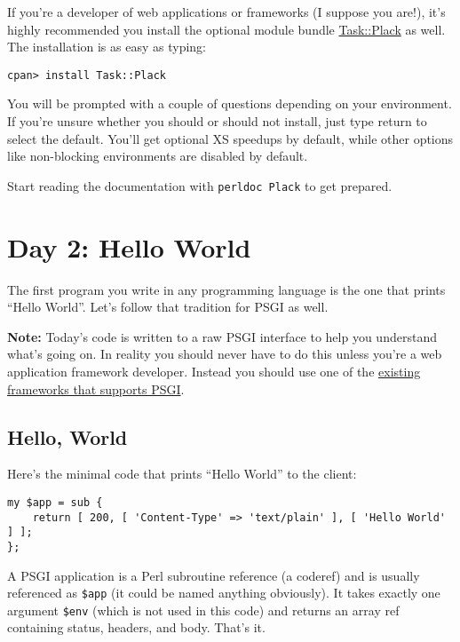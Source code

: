 If you're a developer of web applications or frameworks (I suppose you
are!), it's highly recommended you install the optional module bundle
\href{http://search.cpan.org/dist/Task-Plack}{Task::Plack} as well. The
installation is as easy as typing:

\begin{lstlisting}
cpan> install Task::Plack
\end{lstlisting}

You will be prompted with a couple of questions depending on your
environment. If you're unsure whether you should or should not install,
just type return to select the default. You'll get optional XS speedups
by default, while other options like non-blocking environments are
disabled by default.

Start reading the documentation with \lstinline!perldoc Plack! to get
prepared.

\section{Day 2: Hello World}\label{day-2-hello-world}

The first program you write in any programming language is the one that
prints ``Hello World''. Let's follow that tradition for PSGI as well.

\textbf{Note:} Today's code is written to a raw PSGI interface to help
you understand what's going on. In reality you should never have to do
this unless you're a web application framework developer. Instead you
should use one of the \href{http://plackperl.org/\#frameworks}{existing
frameworks that supports PSGI}.

\subsection{Hello, World}\label{hello-world}

Here's the minimal code that prints ``Hello World'' to the client:

\begin{lstlisting}
my $app = sub {
    return [ 200, [ 'Content-Type' => 'text/plain' ], [ 'Hello World' ] ];
};
\end{lstlisting}

A PSGI application is a Perl subroutine reference (a coderef) and is
usually referenced as \lstinline!$app! (it could be named anything
obviously). It takes exactly one argument \lstinline!$env! (which is not
used in this code) and returns an array ref containing status, headers,
and body. That's it.

